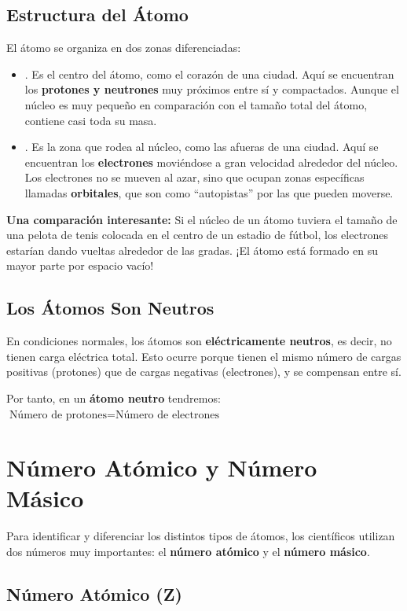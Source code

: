 \subsection{Estructura del Átomo}
El átomo se organiza en dos zonas diferenciadas:
\begin{itemize}
    \item {}. Es el centro del átomo, como el corazón de una ciudad. Aquí se encuentran los \textbf{protones y neutrones} muy próximos entre sí y compactados. Aunque el núcleo es muy pequeño en comparación con el tamaño total del átomo, contiene casi toda su masa.
    \item {}. Es la zona que rodea al núcleo, como las afueras de una ciudad. Aquí se encuentran los \textbf{electrones} moviéndose a gran velocidad alrededor del núcleo. Los electrones no se mueven al azar, sino que ocupan zonas específicas llamadas \textbf{orbitales}, que son como ``autopistas'' por las que pueden moverse.
\end{itemize}
\begin{remark}
    \textbf{Una comparación interesante:} Si el núcleo de un átomo tuviera el tamaño de una pelota de tenis colocada en el centro de un estadio de fútbol, los electrones estarían dando vueltas alrededor de las gradas. ¡El átomo está formado en su mayor parte por espacio vacío!
\end{remark}
\subsection{Los Átomos Son Neutros}
En condiciones normales, los átomos son \textbf{eléctricamente neutros}, es decir, no tienen carga eléctrica total. Esto ocurre porque tienen el mismo número de cargas positivas (protones) que de cargas negativas (electrones), y se compensan entre sí.

Por tanto, en un \textbf{átomo neutro} tendremos: \(\text{Número de protones} = \text{Número de electrones}\)

\section{Número Atómico y Número Másico}

Para identificar y diferenciar los distintos tipos de átomos, los científicos utilizan dos números muy importantes: el \textbf{número atómico} y el \textbf{número másico}.

\subsection{Número Atómico (Z)}

